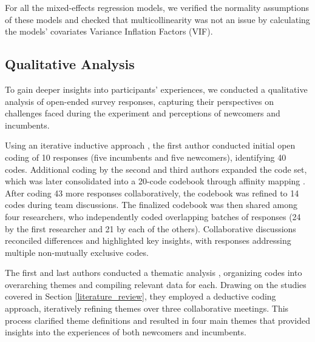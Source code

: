 For all the mixed-effects regression models, we verified the normality assumptions of these models and checked that multicollinearity was not an issue by calculating the models' covariates Variance Inflation Factors (VIF).

\subsection{Qualitative Analysis}
To gain deeper insights into participants' experiences, we conducted a qualitative analysis of open-ended survey responses, capturing their perspectives on challenges faced during the experiment and perceptions of newcomers and incumbents.

Using an iterative inductive approach \cite{saldana2021coding}, the first author conducted initial open coding of 10 responses (five incumbents and five newcomers), identifying 40 codes. Additional coding by the second and third authors expanded the code set, which was later consolidated into a 20-code codebook through affinity mapping \cite{nielsen2024affinity}. After coding 43 more responses collaboratively, the codebook was refined to 14 codes during team discussions. The finalized codebook was then shared among four researchers, who independently coded overlapping batches of responses (24 by the first researcher and 21 by each of the others). Collaborative discussions reconciled differences and highlighted key insights, with responses addressing multiple non-mutually exclusive codes.

The first and last authors conducted a thematic analysis \cite{braun2006using}, organizing codes into overarching themes and compiling relevant data for each. Drawing on the studies covered in Section \ref{literature_review}, they employed a deductive coding approach, iteratively refining themes over three collaborative meetings. This process clarified theme definitions and resulted in four main themes that provided insights into the experiences of both newcomers and incumbents.






 



